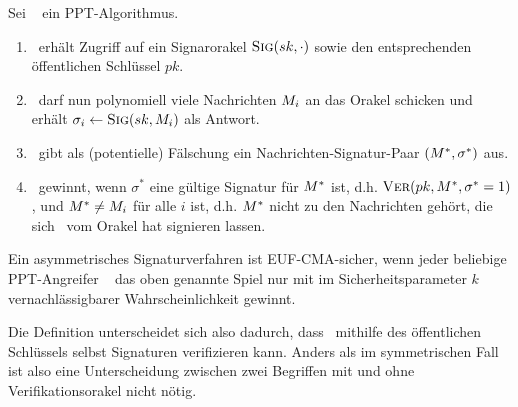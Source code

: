\begin{definition}
Sei \A~ ein PPT-Algorithmus.
\begin{enumerate}
\item \A~erhält Zugriff auf ein Signarorakel $\textsc{Sig}(sk, \cdot)$ sowie den
  entsprechenden öffentlichen Schlüssel $pk$.
\item \A~darf nun polynomiell viele Nachrichten $M_i$ an das
  Orakel schicken und erhält $\sigma_i \leftarrow \textsc{Sig}(sk, M_i)$ als Antwort.
\item \A~gibt als (potentielle) Fälschung ein Nachrichten-Signatur-Paar
  $(M^*,\sigma^*)$ aus.
\item \A~gewinnt, wenn $\sigma^*$ eine gültige Signatur für
  $M^*$ ist, d.h. $\textsc{Ver}(pk, M^*, \sigma^* = 1)$, und $M^*
  \neq M_i$ für alle $i$ ist, d.h. $M^*$ nicht zu den
  Nachrichten gehört, die sich \A~vom Orakel hat signieren lassen.
\end{enumerate} 

Ein asymmetrisches Signaturverfahren ist EUF-CMA-sicher, wenn jeder
beliebige PPT-Angreifer \A~ das oben genannte Spiel nur mit im
Sicherheitsparameter $k$ vernachlässigbarer Wahrscheinlichkeit gewinnt. 
\end{definition}

Die Definition unterscheidet sich also dadurch, dass
\A~mithilfe des öffentlichen Schlüssels selbst Signaturen verifizieren kann. Anders
als im symmetrischen Fall ist also eine Unterscheidung zwischen zwei
Begriffen mit und ohne Verifikationsorakel nicht nötig. 

